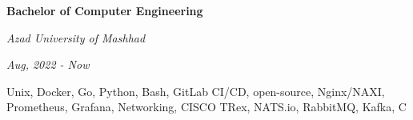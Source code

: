 \documentclass{engineercv}
\begin{document}
\begin{minipage}{\textwidth}
  \begin{multicols}{2}
    \begin{minipage}{0.5\textwidth}
      \textbf{Bachelor of Computer Engineering}

      \textit{Azad University of Mashhad}

      \textit{Aug, 2022 - Now}
    \end{minipage}
    \columnbreak
    \begin{minipage}{0.5\textwidth}
      Unix, Docker, Go, Python, Bash, GitLab CI/CD, open-source,
      Nginx/NAXI, Prometheus, Grafana, Networking, CISCO TRex,
      NATS.io, RabbitMQ, Kafka, C
    \end{minipage}
  \end{multicols}
\end{minipage}
\end{document}

